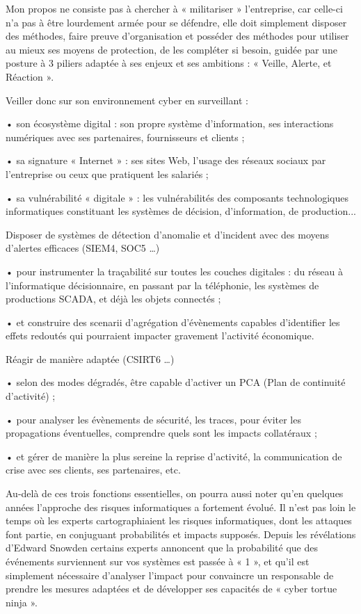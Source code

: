 Mon propos ne consiste pas à chercher à « militariser » l’entreprise, car celle-ci n’a pas à être lourdement armée pour se défendre, elle doit simplement disposer des méthodes, faire preuve d’organisation et posséder des méthodes pour utiliser au mieux ses moyens de protection, de les compléter si besoin, guidée par une posture à 3 piliers adaptée à ses enjeux et ses ambitions : « Veille, Alerte, et Réaction ».
 

Veiller donc sur son environnement cyber en surveillant :

•  son écosystème digital : son propre système d’information, ses interactions numériques avec ses partenaires, fournisseurs et clients ;

•  sa signature « Internet » : ses sites Web, l’usage des réseaux sociaux par l’entreprise ou ceux que pratiquent les salariés ;

•  sa vulnérabilité « digitale » : les vulnérabilités des composants technologiques informatiques constituant les systèmes de décision, d’information, de production...
 

Disposer de systèmes de détection d’anomalie et d’incident avec des moyens d’alertes efficaces (SIEM4, SOC5 …)

•  pour instrumenter la traçabilité sur toutes les couches digitales : du réseau à l’informatique décisionnaire, en passant par la téléphonie, les systèmes de productions SCADA, et déjà les objets connectés ;

•  et construire des scenarii d’agrégation d’évènements capables d’identifier les effets redoutés qui pourraient impacter gravement l’activité économique.
 

Réagir de manière adaptée (CSIRT6 …)

•  selon des modes dégradés, être capable d’activer un PCA (Plan de continuité d’activité) ;

•  pour analyser les évènements de sécurité, les traces, pour éviter les propagations éventuelles, comprendre quels sont les impacts collatéraux ;

•  et gérer de manière la plus sereine la reprise d’activité, la communication de crise avec ses clients, ses partenaires, etc.

Au-delà de ces trois fonctions essentielles, on pourra aussi noter qu’en quelques années l’approche des risques informatiques a fortement évolué. Il n’est pas loin le temps où les experts cartographiaient les risques informatiques, dont les attaques font partie, en conjuguant probabilités et impacts supposés. Depuis les révélations d’Edward Snowden certains experts annoncent que la probabilité que des événements surviennent sur vos systèmes est passée à « 1 », et qu’il est simplement nécessaire d’analyser l’impact pour convaincre un responsable de prendre les mesures adaptées et de développer ses capacités de « cyber tortue ninja ».

